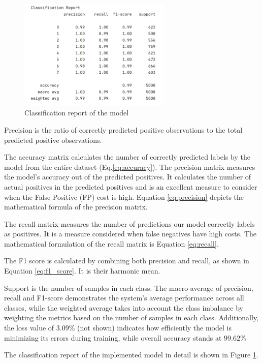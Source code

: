 \begin{figure}
	\centering
	\includegraphics[width = 0.65\textwidth]{images/classific_report.png}
	\caption{Classification report of the model}
	\label{fig:report}
\end{figure}


Precision is the ratio of correctly predicted positive observations to the total predicted positive observations. 

The accuracy matrix calculates the number of correctly predicted labels by the model from the entire dataset (Eq.\ref{eq:accuracy}). 
The precision matrix measures the model's accuracy out of the predicted positives. It calculates the number of actual positives in the predicted positives and is an excellent measure to consider when the False Positive (FP) cost is high. Equation \ref{eq:precision} depicts the mathematical formula of the precision matrix.

The recall matrix measures the number of predictions our model correctly labels as positives. It is a measure considered when false negatives have high costs. The mathematical formulation of the recall matrix is Equation \ref{eq:recall}. 

The F1 score is calculated by combining both precision and recall, as shown in Equation \ref{eq:f1_score}. It is their harmonic mean.

Support is the number of samples in each class. 
The macro-average of precision, recall and F1-score demonstrates the system's average performance across all classes, while the weighted average takes into account the class imbalance by weighting the metrics based on the number of samples in each class.\newline
 Additionally, the loss value of $3.09\%$ (not shown) indicates how efficiently the model is minimizing its errors during training, while overall accuracy stands at $99.62\%$

The classification report of the implemented model in detail is shown in Figure \ref{fig:report}. 


